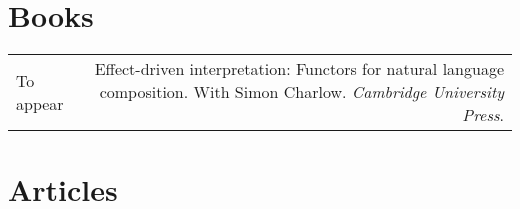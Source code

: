 \documentclass[12pt]{article}
\renewcommand{\arraystretch}{1.25} %
\newcommand{\refmark}{\textcolor{gray}{}}
\newcommand{\flag}{\llap{\refmark~~}}
\begin{document}
\medskip

\section*{Books}

\begingroup
\renewcommand{\arraystretch}{1.5} %
\begin{longtable}{LR}
  \flag%
  To appear
        & Effect-driven interpretation: Functors for natural language composition.\newline
          With Simon Charlow.\newline
          \textit{Cambridge University Press}.\\
\end{longtable}
\endgroup

\medskip

\section*{Articles%
}
\end{document}
